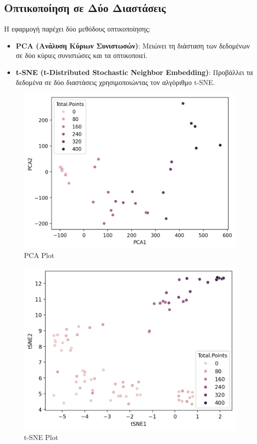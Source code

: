 \documentclass{article}
\begin{document}
\subsection{Οπτικοποίηση σε Δύο Διαστάσεις}
Η εφαρμογή παρέχει δύο μεθόδους οπτικοποίησης:
\begin{itemize}
    \item \textbf{PCA (Ανάλυση Κύριων Συνιστωσών)}: Μειώνει τη διάσταση των δεδομένων σε δύο κύριες συνιστώσες και τα οπτικοποιεί.
    \item \textbf{t-SNE (t-Distributed Stochastic Neighbor Embedding)}: Προβάλλει τα δεδομένα σε δύο διαστάσεις χρησιμοποιώντας τον αλγόριθμο t-SNE.
\end{itemize}

\begin{figure}[h!]
    \centering
    \includegraphics[width=\textwidth]{pca_plot.png}
    \caption{PCA Plot}
    \label{fig:pca}
\end{figure}

\begin{figure}[h!]
    \centering
    \includegraphics[width=\textwidth]{tsne_plot.png}
    \caption{t-SNE Plot}
    \label{fig:tsne}
\end{figure}
\end{document}
